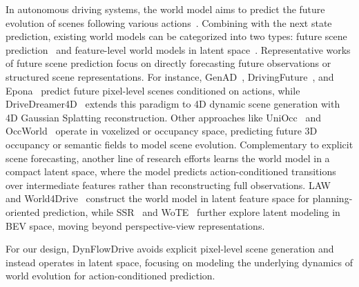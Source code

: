 In autonomous driving systems, the world model aims to predict the future evolution of scenes following various actions~\cite{guan2024world,kong20253d,wang2024drivingfuture,zheng2025world4drive,li2024law}. 
Combining with the next state prediction, existing world models can be categorized into two types: future scene prediction~\cite{wang2024drivingfuture,zhang2025epona,zhao2025drivedreamer4d,wang2025uniocc,zheng2024occworld} and feature-level world models in latent space~\cite{li2024law,li2025wote,li2024ssr,yang2025worldrft}. 
Representative works of future scene prediction focus on directly forecasting future observations or structured scene representations. 
For instance, GenAD~\cite{yang2024generalized}, DrivingFuture~\cite{wang2024drivingfuture}, and Epona~\cite{zhang2025epona} predict future pixel-level scenes conditioned on actions, while DriveDreamer4D~\cite{zhao2025drivedreamer4d} extends this paradigm to 4D dynamic scene generation with 4D Gaussian Splatting reconstruction. 
Other approaches like UniOcc~\cite{wang2025uniocc} and OccWorld~\cite{zheng2024occworld} operate in voxelized or occupancy space, predicting future 3D occupancy or semantic fields to model scene evolution.
Complementary to explicit scene forecasting, another line of research efforts learns the world model in a compact latent space, where the model predicts action-conditioned transitions over intermediate features rather than reconstructing full observations. 
LAW~\cite{li2024law} and World4Drive~\cite{zheng2025world4drive} construct the world model in latent feature space for planning-oriented prediction, while SSR~\cite{li2024ssr} and WoTE~\cite{li2025wote} further explore latent modeling in BEV space, moving beyond perspective-view representations.

For our design, DynFlowDrive avoids explicit pixel-level scene generation and instead operates in latent space, focusing on modeling the underlying dynamics of world evolution for action-conditioned prediction.




